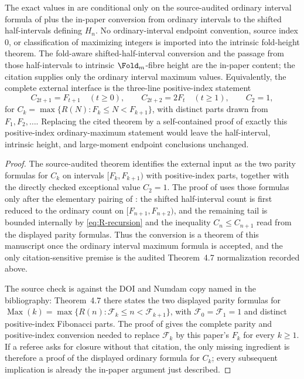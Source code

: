 \begin{corollary}
\label{cor:citation-sensitive-half-interval-conversion}
The exact values in  are
conditional only on the source-audited ordinary interval formula of
 plus the in-paper conversion
from ordinary intervals to the shifted half-intervals defining \(H_n\).  No
ordinary-interval endpoint convention, source index \(0\), or classification of
maximizing integers is imported into the intrinsic fold-height theorem.  The
fold-aware shifted-half-interval conversion and the passage from those
half-intervals to intrinsic \(\Fold_m\)-fibre height are the in-paper content;
the citation supplies only the ordinary interval maximum values.  Equivalently,
the complete external interface is the three-line positive-index statement
\[
  C_{2t+1}=F_{t+1}\quad(t\ge0),
  \qquad C_{2t+2}=2F_t\quad(t\ge1),
  \qquad C_2=1,
\]
for \(C_k=\max\{R(N):F_k\le N<F_{k+1}\}\), with distinct parts drawn from
\(F_1,F_2,\ldots\).  Replacing the cited theorem by a self-contained proof of
exactly this positive-index ordinary-maximum statement would leave the
half-interval, intrinsic height, and large-moment endpoint conclusions unchanged.
\end{corollary}

\begin{proof}
The source-audited theorem identifies the external input as the two parity
formulas for \(C_k\) on intervals \([F_k,F_{k+1})\) with positive-index parts,
together with the directly checked exceptional value \(C_2=1\).  The proof of
 uses those formulas only
after the elementary pairing of : the
shifted half-interval count is first reduced to the ordinary count on
\([F_{n+1},F_{n+2})\), and the remaining tail is bounded internally by
\eqref{eq:R-recursion} and the inequality \(C_n\le C_{n+1}\) read from the
displayed parity formulas.  Thus the conversion is a theorem of this manuscript
once the ordinary interval maximum formula is accepted, and the only
citation-sensitive premise is the audited Theorem~4.7 normalization recorded
above.

The source check is against the DOI and Numdam copy named in the bibliography:
Theorem~4.7 there states the two displayed parity formulas for
\(\operatorname{Max}(k)=\max\{R(n):\mathcal F_k\le n<\mathcal F_{k+1}\}\), with
\(\mathcal F_0=\mathcal F_1=1\) and distinct positive-index Fibonacci parts.  The
proof of  gives the complete
parity and positive-index conversion needed to replace \(\mathcal F_k\) by this
paper's \(F_k\) for every \(k\ge1\).  If a referee asks for closure without that
citation, the only missing ingredient is therefore a proof of the displayed
ordinary formula for \(C_k\); every subsequent implication is already the
in-paper argument just described.
\end{proof}

